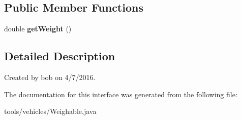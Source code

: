 \subsection*{Public Member Functions}
\begin{DoxyCompactItemize}
\item 
double {\bfseries get\+Weight} ()\hypertarget{interfacetools_1_1vehicles_1_1_weighable_ae01d2ce6524281d6f4cbe940f06c0633}{}\label{interfacetools_1_1vehicles_1_1_weighable_ae01d2ce6524281d6f4cbe940f06c0633}

\end{DoxyCompactItemize}


\subsection{Detailed Description}
Created by bob on 4/7/2016. 

The documentation for this interface was generated from the following file\+:\begin{DoxyCompactItemize}
\item 
tools/vehicles/Weighable.\+java\end{DoxyCompactItemize}
